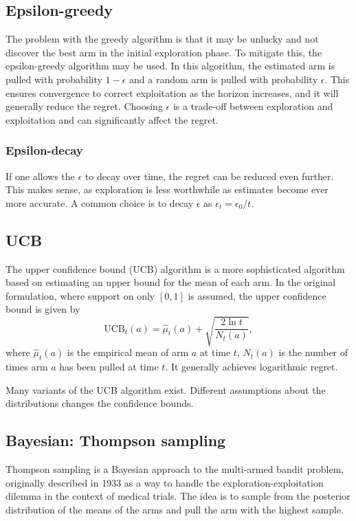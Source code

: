 \subsection{Epsilon-greedy}
The problem with the greedy algorithm is that it may be unlucky and not discover the best arm in the initial exploration phase.
To mitigate this, the epsilon-greedy algorithm may be used.
In this algorithm, the estimated arm is pulled with probability $1-\epsilon$ and a random arm is pulled with probability $\epsilon$.
This ensures convergence to correct exploitation as the horizon increases, and it will generally reduce the regret.
Choosing $\epsilon$ is a trade-off between exploration and exploitation and can significantly affect the regret.

\subsubsection{Epsilon-decay}
If one allows the $\epsilon$ to decay over time, the regret can be reduced even further.
This makes sense, as exploration is less worthwhile as estimates become ever more accurate.
A common choice is to decay $\epsilon$ as $\epsilon_t = \epsilon_0 / t$.

\subsection{UCB}
The upper confidence bound (UCB) algorithm is a more sophisticated algorithm based on estimating an upper bound for the mean of each arm.
In the original formulation, where support on only $[0,1]$ is assumed, the upper confidence bound is given by
\begin{equation}
    \text{UCB}_t(a) = \hat{\mu}_t(a) + \sqrt{\frac{2\ln t}{N_t(a)}},
\end{equation}
where $\hat{\mu}_t(a)$ is the empirical mean of arm $a$ at time $t$, $N_t(a)$ is the number of times arm $a$ has been pulled at time $t$.
It generally achieves logarithmic regret.

Many variants of the UCB algorithm exist.
Different assumptions about the distributions changes the confidence bounds.

\subsection{Bayesian: Thompson sampling}
Thompson sampling is a Bayesian approach to the multi-armed bandit problem, originally described in 1933 as a way to handle the exploration-exploitation dilemma in the context of medical trials.
The idea is to sample from the posterior distribution of the means of the arms and pull the arm with the highest sample.